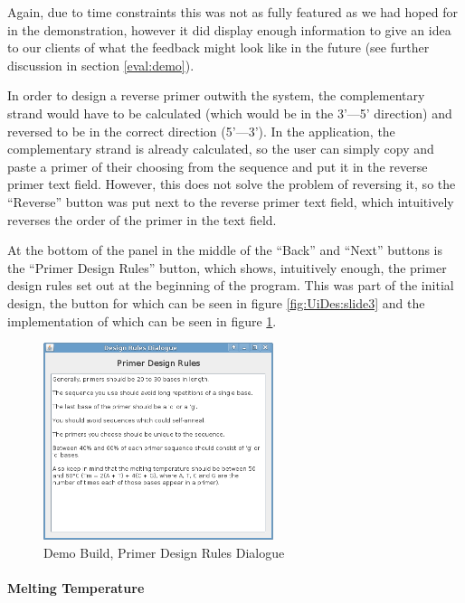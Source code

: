Again, due to time constraints this was not as fully featured as we
had hoped for in the demonstration, however it did display enough
information to give an idea to our clients of what the feedback might
look like in the future (see further discussion in section
\ref{eval:demo}).

In order to design a reverse primer outwith the system, the
complementary strand would have to be calculated (which would be in
the 3'---5' direction) and reversed to be in the correct direction
(5'---3').
In the application, the complementary strand is already calculated, so
the user can simply copy and paste a primer of their choosing from the
sequence and put it in the reverse primer text field.
However, this does not solve the problem of reversing it, so the
``Reverse'' button was put next to the reverse primer text field,
which intuitively reverses the order of the primer in the text
field. 

At the bottom of the panel in the middle of the ``Back'' and ``Next''
buttons is the ``Primer Design Rules'' button, which shows,
intuitively enough, the primer design rules set out at the beginning
of the program.
This was part of the initial design, the button for which can be seen
in figure \ref{fig:UiDes:slide3} and the implementation of which can
be seen in figure \ref{fig:demoBuild:primerDesignRules}.

\begin{figure}[h]
  \begin{center}
    \includegraphics[width=0.6\textwidth]{./images/demoBuild/primerDesignRules.png}
    \caption{
      \label{fig:demoBuild:primerDesignRules}
      Demo Build, Primer Design Rules Dialogue
    }
  \end{center}
\end{figure}

\paragraph{Melting Temperature}

